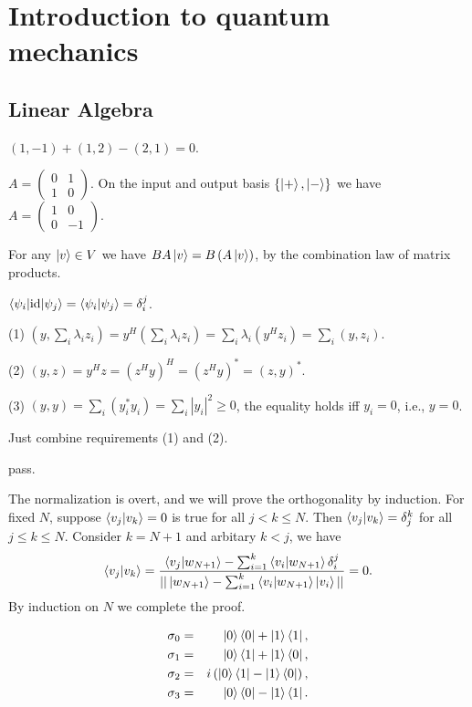 \chapter{Introduction to quantum mechanics}

\section{Linear Algebra}

\ex $(1, -1) + (1, 2) - (2, 1) = 0$.

\ex $A=\begin{pmatrix}0&1\\1&0\end{pmatrix}$.
On the input and output basis $\{\left|+\right\rangle,\left|-\right\rangle\}$ we have $A=\begin{pmatrix}1&0\\0&-1\end{pmatrix}$.

\ex For any $\left|v\right\rangle\in V$ we have $BA\left|v\right\rangle=B\left(A\left|v\right\rangle\right)$, by the combination law of matrix products.

\ex $\left\langle\psi_i\middle|\operatorname{id}\middle|\psi_j\right\rangle=\left\langle\psi_i\middle|\psi_j\right\rangle=\delta_i^j$.

\ex (1) $(y,\sum_i\lambda_iz_i) = y^H(\sum_i\lambda_iz_i)=\sum_i\lambda_i(y^Hz_i)=\sum_i(y,z_i)$.

(2) $(y,z)=y^Hz=(z^Hy)^H=(z^Hy)^*=(z,y)^*$.

(3) $(y,y)=\sum_i(y_i^*y_i)=\sum_i|y_i|^2\ge 0$, the equality holds iff $y_i=0$, i.e., $y=0$.

\ex Just combine requirements (1) and (2).

\ex pass.

\ex The normalization is overt, and we will prove the orthogonality by induction.
For fixed $N$, suppose $\left\langle v_j\middle|v_k\right\rangle=0$ is true for all $j<k\le N$.
Then $\left\langle v_j\middle|v_k\right\rangle=\delta_j^k$ for all $j\le k\le N$.
Consider $k=N+1$ and arbitary $k<j$, we have
$$\left\langle v_j\middle|v_k\right\rangle=\frac{\left\langle v_j\middle|w_{N+1}\right\rangle-\sum_{i=1}^k\left\langle v_i\middle|w_{N+1}\right\rangle\delta_i^j}{||\left|w_{N+1}\right\rangle-\sum_{i=1}^k\left\langle v_i\middle|w_{N+1}\right\rangle\left|v_i\right\rangle||}=0.$$
By induction on $N$ we complete the proof.

\ex $$\begin{aligned}
    \sigma_0 & = & \left|0\right\rangle\left\langle0\right|+\left|1\right\rangle\left\langle1\right|,\\
    \sigma_1 & = & \left|0\right\rangle\left\langle1\right|+\left|1\right\rangle\left\langle0\right|,\\
    \sigma_2 & = & i\left(\left|0\right\rangle\left\langle1\right|-\left|1\right\rangle\left\langle0\right|\right),\\
    \sigma_3 & = & \left|0\right\rangle\left\langle0\right|-\left|1\right\rangle\left\langle1\right|.
\end{aligned}$$


